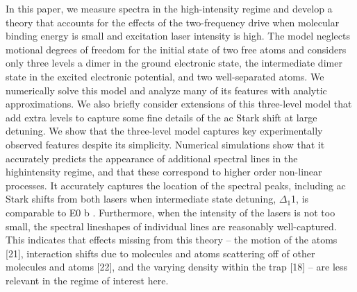 In this paper, we measure spectra in the high-intensity
regime and develop a theory that accounts for the effects of the two-frequency drive when molecular binding energy is small and excitation laser intensity is high.
The model neglects motional degrees of freedom for the
initial state of two free atoms and considers only three
levels a dimer in the ground electronic state, the intermediate dimer state in the excited electronic potential,
and two well-separated atoms. We numerically solve this model and analyze many of its features with analytic approximations. We also briefly consider extensions of this
three-level model that add extra levels to capture some
fine details of the ac Stark shift at large detuning.
We show that the three-level model captures key
experimentally observed features despite its simplicity.
Numerical simulations show that it accurately predicts
the appearance of additional spectral lines in the highintensity regime, and that these correspond to higher order non-linear processes. It accurately captures the location of the spectral peaks, including ac Stark shifts
from both lasers when intermediate state detuning, $\Delta_1$1,
is comparable to E0
b
. Furthermore, when the intensity of
the lasers is not too small, the spectral lineshapes of individual lines are reasonably well-captured. This indicates
that effects missing from this theory – the motion of the
atoms [21], interaction shifts due to molecules and atoms
scattering off of other molecules and atoms [22], and the
varying density within the trap [18] – are less relevant in
the regime of interest here.







